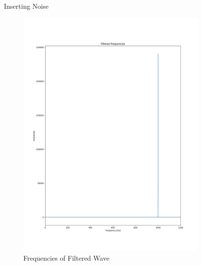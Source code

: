 \begin{hwkProblem}{6.1}{Inserting Noise}
	\begin{figure}[ht!]
	  \centering
	  \includegraphics[width=0.85\textwidth]{./6.1.4.png}
	  \caption{Frequencies of Filtered Wave}
	\end{figure}

	\newpage
	\solpart


\end{hwkProblem}
